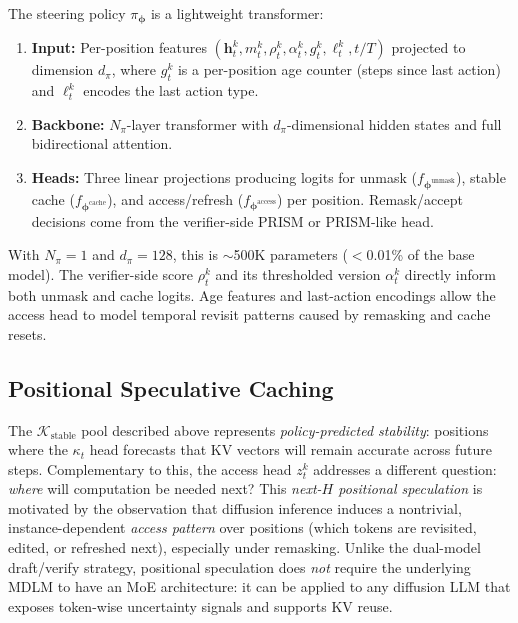 \documentclass[11pt]{article}
\newcommand{\cK}{\mathcal{K}}
\newcommand{\bphi}{\bm{\phi}}
\newcommand{\bh}{\mathbf{h}}
\begin{document}
The steering policy $\pi_{\bphi}$ is a lightweight transformer:
\begin{enumerate}[leftmargin=*,itemsep=2pt]
    \item \textbf{Input:} Per-position features $(\bh_t^k, m_t^k, \rho_t^k, \alpha_t^k, g_t^k, \ell_t^k, t/T)$ projected to dimension $d_\pi$, where $g_t^k$ is a per-position age counter (steps since last action) and $\ell_t^k$ encodes the last action type.
    \item \textbf{Backbone:} $N_\pi$-layer transformer with $d_\pi$-dimensional hidden states and full bidirectional attention.
    \item \textbf{Heads:} Three linear projections producing logits for unmask ($f_{\bphi^{\text{unmask}}}$), stable cache ($f_{\bphi^{\text{cache}}}$), and access/refresh ($f_{\bphi^{\text{access}}}$) per position. Remask/accept decisions come from the verifier-side PRISM or PRISM-like head.
\end{enumerate}
With $N_\pi = 1$ and $d_\pi = 128$, this is ${\sim}$500K parameters ($<$0.01\% of the base model).
The verifier-side score $\rho_t^k$ and its thresholded version $\alpha_t^k$ directly inform both unmask and cache logits.
Age features and last-action encodings allow the access head to model temporal revisit patterns caused by remasking and cache resets.

\subsection{Positional Speculative Caching}
\label{sec:positional_spec_cache}

The $\cK_{\text{stable}}$ pool described above represents \emph{policy-predicted stability}: positions where the $\kappa_t$ head forecasts that KV vectors will remain accurate across future steps.
Complementary to this, the access head $z_t^k$ addresses a different question: \emph{where} will computation be needed next?
This \emph{next-$H$ positional speculation} is motivated by the observation that diffusion inference induces a nontrivial, instance-dependent \emph{access pattern} over positions (which tokens are revisited, edited, or refreshed next), especially under remasking.
Unlike the dual-model draft/verify strategy, positional speculation does \emph{not} require the underlying MDLM to have an MoE architecture: it can be applied to any diffusion LLM that exposes token-wise uncertainty signals and supports KV reuse.
\end{document}
